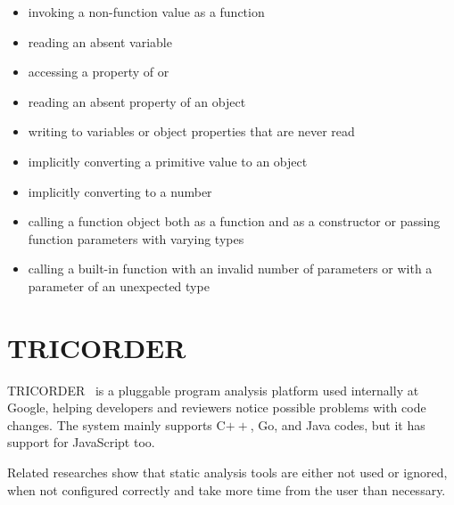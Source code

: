 \begin{itemize}[topsep=0pt]
  \item invoking a non-function value as a function
  \item reading an absent variable
  \item accessing a property of  or 
  \item reading an absent property of an object
  \item writing to variables or object properties that are never read
  \item implicitly converting a primitive value to an object
  \item implicitly converting  to a number
  \item calling a function object both as a function and as a constructor or passing function parameters with varying types
  \item calling a built-in function with an invalid number of parameters or with a parameter of an unexpected type
\end{itemize}


\section{TRICORDER}
TRICORDER~\cite{tricorder} is a pluggable program analysis platform used internally at Google, helping developers and reviewers notice possible problems with code changes. The system mainly supports C$++$, Go, and Java codes, but it has support for JavaScript too.

Related researches show that static analysis tools are either not used or ignored, when not configured correctly and take more time from the user than necessary. 


